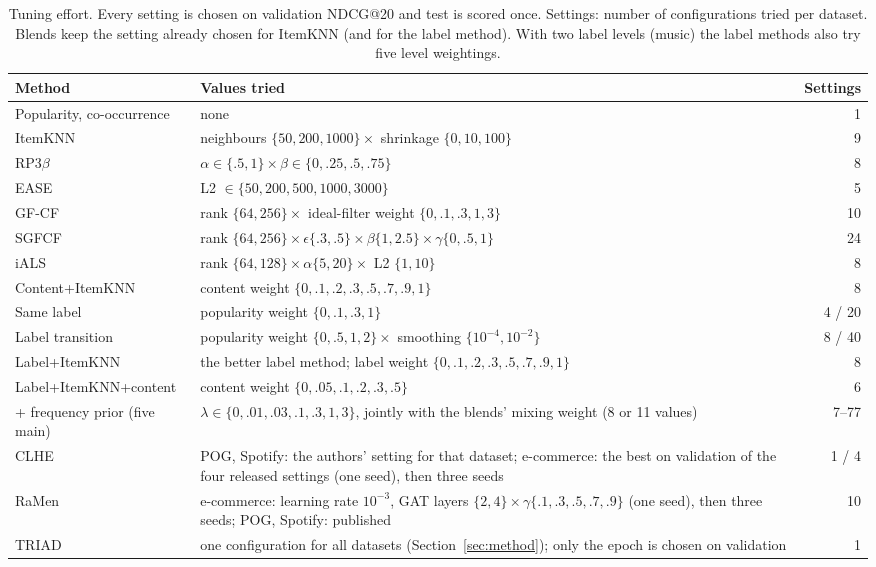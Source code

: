 \documentclass[runningheads]{llncs}
\begin{document}
\begin{table}[t]
\centering
\caption{Tuning effort. Every setting is chosen on validation NDCG@20 and test is scored once. Settings: number of
configurations tried per dataset. Blends keep the setting already chosen for ItemKNN (and for the label method). With
two label levels (music) the label methods also try five level weightings.}
\label{tab:tuning}
\setlength{\tabcolsep}{3pt}
\scriptsize
\begin{tabular}{l>{\raggedright\arraybackslash}p{}r}
\toprule
Method & Values tried & Settings\\
\midrule
Popularity, co-occurrence & none & 1\\
ItemKNN & neighbours $\{50,200,1000\}\times$ shrinkage $\{0,10,100\}$ & 9\\
RP3$\beta$ & $\alpha\in\{.5,1\}\times\beta\in\{0,.25,.5,.75\}$ & 8\\
EASE & L2 $\in\{50,200,500,1000,3000\}$ & 5\\
GF-CF & rank $\{64,256\}\times$ ideal-filter weight $\{0,.1,.3,1,3\}$ & 10\\
SGFCF & rank $\{64,256\}\times\epsilon\{.3,.5\}\times\beta\{1,2.5\}\times\gamma\{0,.5,1\}$ & 24\\
iALS & rank $\{64,128\}\times\alpha\{5,20\}\times$ L2 $\{1,10\}$ & 8\\
Content+ItemKNN & content weight $\{0,.1,.2,.3,.5,.7,.9,1\}$ & 8\\
Same label & popularity weight $\{0,.1,.3,1\}$ & 4 / 20\\
Label transition & popularity weight $\{0,.5,1,2\}\times$ smoothing $\{10^{-4},10^{-2}\}$ & 8 / 40\\
Label+ItemKNN & the better label method; label weight $\{0,.1,.2,.3,.5,.7,.9,1\}$ & 8\\
Label+ItemKNN+content & content weight $\{0,.05,.1,.2,.3,.5\}$ & 6\\
+ frequency prior (five main) & $\lambda\in\{0,.01,.03,.1,.3,1,3\}$, jointly with the blends' mixing weight (8 or 11 values) & 7--77\\
\midrule
CLHE & POG, Spotify: the authors' setting for that dataset; e-commerce: the best on validation of the four released
settings (one seed), then three seeds & 1 / 4\\
RaMen & e-commerce: learning rate $10^{-3}$, GAT layers $\{2,4\}\times\gamma\{.1,.3,.5,.7,.9\}$ (one seed), then three
seeds; POG, Spotify: published & 10\\
\midrule
TRIAD & one configuration for all datasets (Section~\ref{sec:method}); only the epoch is chosen on validation & 1\\
\bottomrule
\end{tabular}
\end{table}
\end{document}
